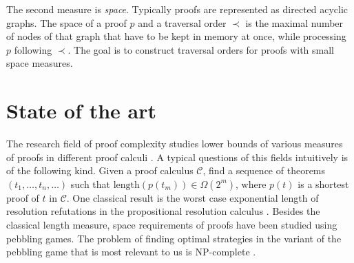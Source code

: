 The second measure is \emph{space}.
Typically proofs are represented as directed acyclic graphs.
The space of a proof $p$ and a traversal order $\prec$ is the maximal number of nodes of that graph that have to be kept in memory at once, while processing $p$ following $\prec$.
The goal is to construct traversal orders for proofs with small space measures.

%
%


\section{State of the art}

The research field of proof complexity studies lower bounds of various measures of proofs in different proof calculi \cite{Arora2009,Beame1998a,Cook1979}. A typical questions of this fields intuitively is of the following kind. Given a proof calculus $\mathcal{C}$, find a sequence of theorems $(t_1,\ldots, t_n, \ldots)$ such that $\mathrm{length}(p(t_m)) \in \Omega(2^m)$, where $p(t)$ is a shortest proof of $t$ in $\mathcal{C}$.
%
%
One classical result is the worst case exponential length of resolution refutations in the propositional resolution calculus \cite{Arora2009}.
Besides the classical length measure, space requirements of proofs have been studied \cite{Ben-Sasson2002,Esteban2001,Hopcroft1977,Nordstroem2013,Sethi1975} using pebbling games.
The problem of finding optimal strategies in the variant of the pebbling game that is most relevant to us is NP-complete \cite{Sethi1975}.

